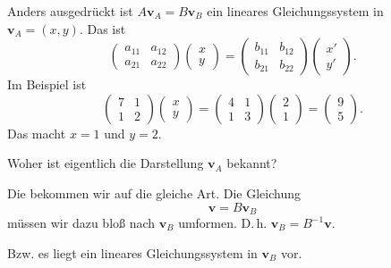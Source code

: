 \documentclass[9pt]{beamer}
\newcommand{\bv}[1]{\mathbf{#1}}
\begin{document}
\begin{frame}
Anders ausgedrückt ist $A\bv v_A = B\bv v_B$ ein lineares
Gleichungssystem in $\bv v_A=(x,y)$.\pause{} Das ist
\[\begin{pmatrix}a_{11} & a_{12}\\ a_{21} & a_{22}\end{pmatrix}\begin{pmatrix}x\\ y\end{pmatrix}
= \begin{pmatrix}b_{11} & b_{12}\\ b_{21} & b_{22}\end{pmatrix}\begin{pmatrix}x'\\ y'\end{pmatrix}.
\]\pause{}
Im Beispiel ist
\[\begin{pmatrix}7 & 1\\ 1 & 2\end{pmatrix}\begin{pmatrix}x\\ y\end{pmatrix}
= \begin{pmatrix}4 & 1\\ 1 & 3\end{pmatrix}\begin{pmatrix}2\\ 1\end{pmatrix}
= \begin{pmatrix}9\\ 5\end{pmatrix}.\]\pause
Das macht $x=1$ und $y=2$.
\end{frame}

\begin{frame}
Woher ist eigentlich die Darstellung $\bv v_A$ bekannt?\pause

\vspace{0.8em}
Die bekommen wir auf die gleiche Art.  Die Gleichung
\[\bv v = B\bv v_B\]
müssen wir dazu bloß nach $\bv v_B$ umformen. D.\,h.
$\bv v_B = B^{-1}\bv v$.\pause

\vspace{0.8em}
Bzw. es liegt ein lineares Gleichungssystem
in $\bv v_B$ vor.
\end{frame}
\end{document}
